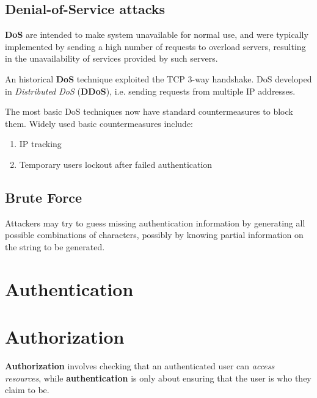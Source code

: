 \subsection{Denial-of-Service attacks}
\textbf{DoS} are intended to make system unavailable for normal use,
and were typically implemented by sending a high number of requests to overload servers,
resulting in the unavailability of services provided by such servers.

An historical \textbf{DoS} technique exploited the TCP 3-way handshake.
DoS developed in \textit{Distributed DoS} (\textbf{DDoS}),
i.e. sending requests from multiple IP addresses.

The most basic DoS techniques now have standard countermeasures to block them.
Widely used basic countermeasures include:
\begin{enumerate}
   \item IP tracking
   \item Temporary users lockout after failed authentication
\end{enumerate}

\subsection{Brute Force}
Attackers may try to guess missing authentication information by generating all possible combinations of characters,
possibly by knowing partial information on the string to be generated.


\section{Authentication}

\section{Authorization}
\textbf{Authorization} involves checking that an authenticated user can \textit{access resources},
while \textbf{authentication} is only about ensuring that the user is who they claim to be.